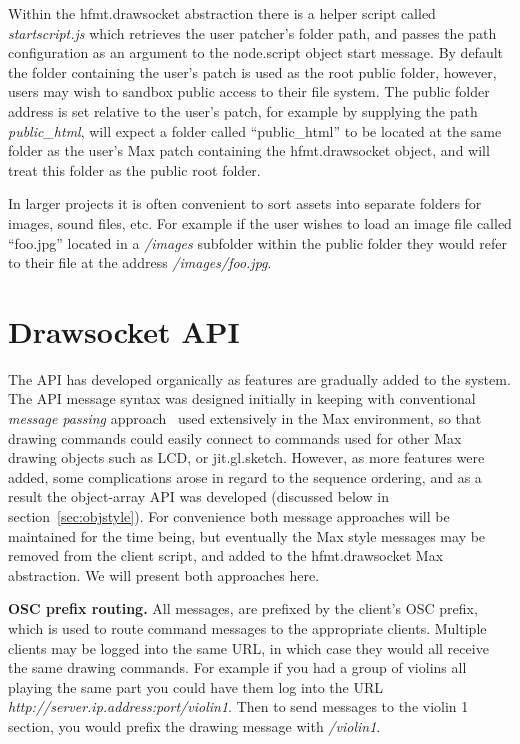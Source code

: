 Within the hfmt.drawsocket abstraction there is a helper script called \textit{startscript.js} which retrieves the user patcher's folder path, and passes the path configuration as an argument to the node.script object start message. 
By default the folder containing the user's patch is used as the root public folder, however, users may wish to sandbox public access to their file system.
The public folder address is set relative to the user's patch, for example by supplying the path \textit{public\_html}, \drawsocket will expect a folder called ``public\_html'' to be located at the same folder as the user's Max patch containing the hfmt.drawsocket object, and will treat this folder as the public root folder.

In larger projects it is often convenient to sort assets into separate folders for images, sound files, etc. For example if the user wishes to load an image file called ``foo.jpg'' located in a \textit{/images} subfolder within the public folder they would refer to their file at the address \textit{/images/foo.jpg}.

\section{Drawsocket API}\label{sec:api}

The \drawsocket API has developed organically as features are gradually added to the system.
The API message syntax was designed initially in keeping with conventional \textit{message passing} approach~\cite{mitchell2003concepts} used extensively in the Max environment, so that drawing commands could easily connect to commands used for other Max drawing objects such as LCD, or jit.gl.sketch.
However, as more features were added, some complications arose in regard to the sequence ordering, and as a result the object-array API was developed (discussed below in section~\ref{sec:objstyle}).
For convenience both message approaches will be maintained for the time being, but eventually the Max style messages may be removed from the client script, and added to the hfmt.drawsocket Max abstraction.
We will present both approaches here.

\medskip
\noindent
\textbf{OSC prefix routing.}  
All messages, are prefixed by the client's OSC prefix, which is used to route command messages to the appropriate clients. 
Multiple clients may be logged into the same URL, in which case they would all receive the same drawing commands. For example if you had a group of violins all playing the same part you could have them log into the URL \textit{http://server.ip.address:port/violin1}.
Then to send messages to the violin 1 section, you would prefix the drawing message with \textit{/violin1}.

